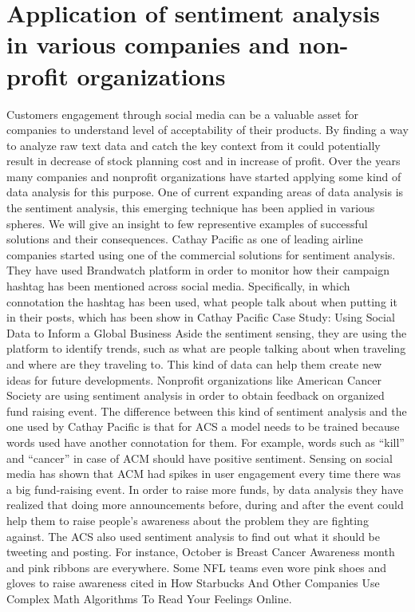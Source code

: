 \section{Application of sentiment analysis in various companies and non-profit organizations}
Customers engagement through social media can be a valuable asset for companies to understand level of acceptability of their products. By finding a way to analyze raw text data and catch the key context from it could potentially result in decrease of stock planning cost and in increase of profit.
Over the years many companies and nonprofit organizations have started applying some kind of data analysis for this purpose. One of current expanding areas of data analysis is the sentiment analysis, this emerging technique has been applied in various spheres. We will give an insight to few representive examples of successful solutions and their consequences.
Cathay Pacific as one of leading airline companies started using one of the commercial solutions for sentiment analysis. They have used Brandwatch platform in order to monitor how their campaign hashtag has been mentioned across social media. Specifically, in which connotation the hashtag has been used, what people talk about when putting it in their posts, which has been show in Cathay Pacific Case Study: Using Social Data to Inform a Global Business \cite{CathayPacific} Aside the sentiment sensing, they are using the platform to identify trends, such as what are people talking about when traveling and where are they traveling to. This kind of data can help them create new ideas for future developments.
Nonprofit organizations like American Cancer Society are using sentiment analysis in order to obtain feedback on organized fund raising event. The difference between this kind of sentiment analysis and the one used by Cathay Pacific is that for ACS a model needs to be trained because words used have another connotation for them. For example, words such as “kill” and “cancer” in case of ACM should have positive sentiment. Sensing on social media has shown that ACM had spikes in user engagement every time there was a big fund-raising event. In order to raise more funds, by data analysis they have realized that doing more announcements before, during and after the event could help them to raise people’s awareness about the problem they are fighting against. The ACS also used sentiment analysis to find out what it should be tweeting and posting. For instance, October is Breast Cancer Awareness month and pink ribbons are everywhere. Some NFL teams even wore pink shoes and gloves to raise awareness cited in How Starbucks And Other Companies Use Complex Math Algorithms To Read Your Feelings Online\cite{Starbucks}.\\

